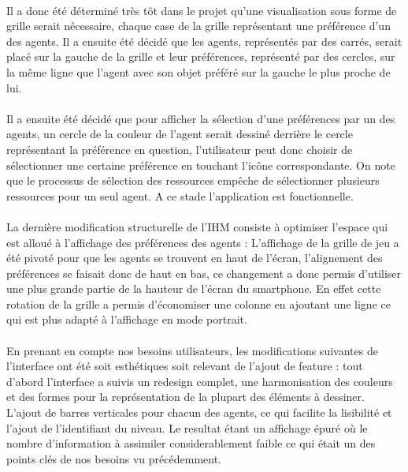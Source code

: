 \documentclass[../main.tex]{subfiles}
\begin{document}
\paragraph{}
Il a donc été déterminé très tôt dans le projet qu’une visualisation sous forme de grille serait nécessaire, chaque case de la grille représentant une préférence d’un des agents. Il a ensuite été décidé que les agents, représentés par des carrés, serait placé sur la gauche de la grille et leur préférences, représenté par des cercles, sur la même ligne que l’agent avec son objet préféré sur la gauche le plus proche de lui.
\paragraph{}
Il a ensuite été décidé que pour afficher la sélection d’une préférences par un des agents, un cercle de la couleur de l’agent serait dessiné derrière le cercle représentant la préférence en question, l'utilisateur peut donc choisir de sélectionner une certaine préférence en touchant l'icône correspondante. On note que le processus de sélection des ressources empêche de sélectionner plusieurs ressources pour un seul agent. A ce stade l’application est fonctionnelle.
\paragraph{}
La dernière modification structurelle de l’IHM consiste à optimiser l’espace qui est alloué à l’affichage des préférences des agents : L'affichage de la grille de jeu a été pivoté pour que les agents se trouvent en haut de l'écran, l'alignement des préférences se faisait donc de haut en bas, ce changement a donc permis d'utiliser une plus grande partie de la hauteur de l'écran du smartphone. En effet cette rotation de la grille a permis d'économiser une colonne en ajoutant une ligne ce qui est plus adapté à l’affichage en mode portrait.
\paragraph{}
En prenant en compte nos besoins utilisateurs, les modifications suivantes de l'interface ont été soit esthétiques soit relevant de l’ajout de feature : tout d’abord l’interface a suivis un redesign complet, une harmonisation des couleurs et des formes pour la représentation de la plupart des éléments à dessiner. L’ajout de barres verticales pour chacun des agents, ce qui facilite la lisibilité et l’ajout de l’identifiant du niveau. Le resultat étant un affichage épuré où le nombre d'information à assimiler considerablement faible ce qui était un des points clés de nos besoins vu précédemment. 
\end{document}

